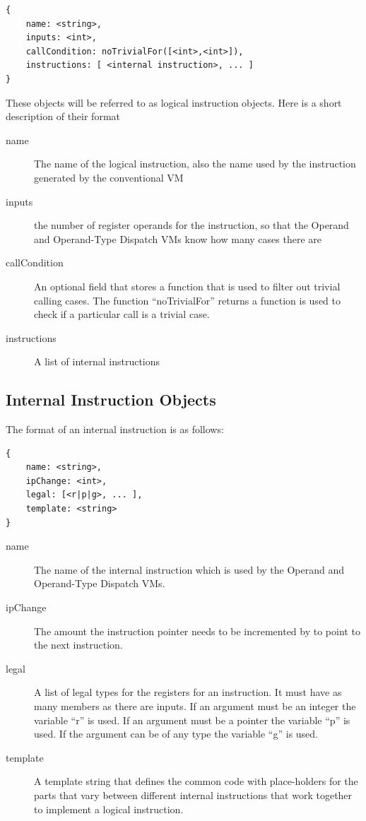 \documentclass[english,a4paper,12pt]{report}
\begin{document}
\begin{lstlisting}
{
    name: <string>,
    inputs: <int>,
    callCondition: noTrivialFor([<int>,<int>]),
    instructions: [ <internal instruction>, ... ]
}	
\end{lstlisting}
These objects will be referred to as logical instruction objects. Here
is a short description of their format
\begin{description}
\item[name] The name of the logical instruction, also the name used by
  the instruction generated by the conventional VM
\item[inputs] the number of register operands for the instruction, so
  that the Operand and Operand-Type Dispatch VMs know how many cases
  there are
\item[callCondition] An optional field that stores a function that is
  used to filter out trivial calling cases. The function
  ``noTrivialFor'' returns a function is used to check if a particular
  call is a trivial case.
	\item[instructions] A list of internal instructions	
\end{description}

\subsection{Internal Instruction Objects}

The format of an internal instruction is as follows:
\begin{lstlisting}
{
    name: <string>,
    ipChange: <int>,
    legal: [<r|p|g>, ... ],
    template: <string>
}
\end{lstlisting}

\begin{description}
\item[name] The name of the internal instruction which is used by the
  Operand and Operand-Type Dispatch VMs.
\item[ipChange] The amount the instruction pointer needs to be
  incremented by to point to the next instruction.
\item[legal] A list of legal types for the registers for an
  instruction. It must have as many members as there are inputs. If an
  argument must be an integer the variable ``r'' is used. If an
  argument must be a pointer the variable ``p'' is used. If the
  argument can be of any type the variable ``g'' is used.
\item[template] A template string that defines the common code with
  place-holders for the parts that vary between different internal
  instructions that work together to implement a logical instruction.
\end{description}
\end{document}
